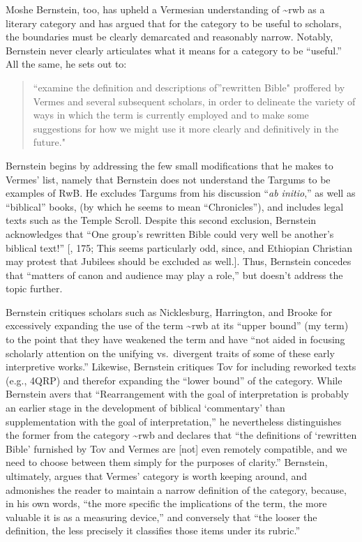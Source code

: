 Moshe Bernstein, too, has upheld a Vermesian understanding of
\textasciitilde{}rwb as a literary category and has argued that for the
category to be useful to scholars, the boundaries must be clearly
demarcated and reasonably narrow.\autocite{bernstein_textus2005}
Notably, Bernstein never clearly articulates what it means for a
category to be ``useful.'' All the same, he sets out to:

\begin{quote}
``examine the definition and descriptions of''rewritten Bible" proffered
by Vermes and several subsequent scholars, in order to delineate the
variety of ways in which the term is currently employed and to make some
suggestions for how we might use it more clearly and definitively in the
future." \autocite[171--172]{bernstein_textus2005}
\end{quote}

Bernstein begins by addressing the few small modifications that he makes
to Vermes' list, namely that Bernstein does not understand the Targums
to be examples of RwB. He excludes Targums from his discussion
``\emph{ab initio},'' as well as ``biblical'' books, (by which he seems
to mean ``Chronicles''), and includes legal texts such as the Temple
Scroll. Despite this second exclusion, Bernstein acknowledges that ``One
group's rewritten Bible could very well be another's biblical text!''
{[}\textcite{bernstein_textus2005}, 175; This seems particularly odd,
since, and Ethiopian Christian may protest that Jubilees should be
excluded as well.{]}. Thus, Bernstein concedes that ``matters of canon
and audience may play a role,'' but doesn't address the topic further.

Bernstein critiques scholars such as
Nicklesburg,\autocite{nickelsburg_stone1984}
Harrington,\autocite{harrington_kraft-nickelsburg1986} and
Brooke\autocite{brooke_schiffman-vanderkam2000} for excessively
expanding the use of the term \textasciitilde{}rwb at its ``upper
bound'' (my term) to the point that they have weakened the term and have
``not aided in focusing scholarly attention on the unifying
vs.~divergent traits of some of these early interpretive
works.''\autocite[179]{bernstein_textus2005} Likewise, Bernstein
critiques Tov for including reworked texts (e.g., 4QRP) and therefor
expanding the ``lower bound'' of the category. While Bernstein avers
that ``Rearrangement with the goal of interpretation is probably an
earlier stage in the development of biblical `commentary' than
supplementation with the goal of interpretation,'' he nevertheless
distinguishes the former from the category \textasciitilde{}rwb and
declares that ``the definitions of `rewritten Bible' furnished by Tov
and Vermes are {[}not{]} even remotely compatible, and we need to choose
between them simply for the purposes of
clarity.''\autocite[185]{bernstein_textus2005} Bernstein, ultimately,
argues that Vermes' category is worth keeping around, and admonishes the
reader to maintain a narrow definition of the category, because, in his
own words, ``the more specific the implications of the term, the more
valuable it is as a measuring
device,''\autocite[195]{bernstein_textus2005} and conversely that ``the
looser the definition, the less precisely it classifies those items
under its rubric.'' \autocite[195]{bernstein_textus2005}

